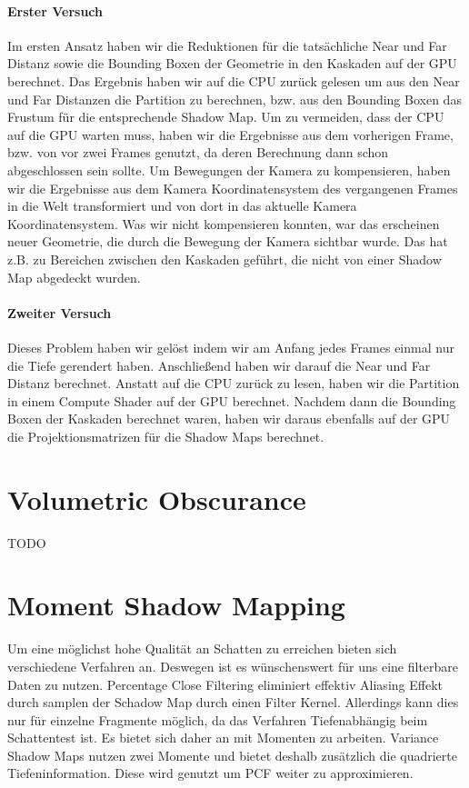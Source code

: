 \documentclass[runningheaders,a4paper]{llncs}
\begin{document}
\paragraph{Erster Versuch}
Im ersten Ansatz haben wir die Reduktionen für die tatsächliche Near und Far Distanz sowie die Bounding Boxen der Geometrie in den Kaskaden auf der GPU berechnet.
Das Ergebnis haben wir auf die CPU zurück gelesen um aus den Near und Far Distanzen die Partition zu berechnen, bzw. aus den Bounding Boxen das Frustum für die entsprechende Shadow Map.
Um zu vermeiden, dass der CPU auf die GPU warten muss, haben wir die Ergebnisse aus dem vorherigen Frame, bzw. von vor zwei Frames genutzt, da deren Berechnung dann schon abgeschlossen sein sollte.
Um Bewegungen der Kamera zu kompensieren, haben wir die Ergebnisse aus dem Kamera Koordinatensystem des vergangenen Frames in die Welt transformiert und von dort in das aktuelle Kamera Koordinatensystem.
Was wir nicht kompensieren konnten, war das erscheinen neuer Geometrie, die durch die Bewegung der Kamera sichtbar wurde.
Das hat z.B. zu Bereichen zwischen den Kaskaden geführt, die nicht von einer Shadow Map abgedeckt wurden.

\paragraph{Zweiter Versuch}
Dieses Problem haben wir gelöst indem wir am Anfang jedes Frames einmal nur die Tiefe gerendert haben.
Anschließend haben wir darauf die Near und Far Distanz berechnet.
Anstatt auf die CPU zurück zu lesen, haben wir die Partition in einem Compute Shader auf der GPU berechnet.
Nachdem dann die Bounding Boxen der Kaskaden berechnet waren, haben wir daraus ebenfalls auf der GPU die Projektionsmatrizen für die Shadow Maps berechnet.

\section{Volumetric Obscurance}

	TODO
	
\section{Moment Shadow Mapping}
Um eine möglichst hohe Qualität an Schatten zu erreichen bieten sich verschiedene Verfahren an. Deswegen ist es wünschenswert für uns eine filterbare Daten zu nutzen. Percentage Close Filtering eliminiert effektiv Aliasing Effekt durch samplen der Schadow Map durch einen Filter Kernel.\cite{msm} Allerdings kann dies nur für einzelne Fragmente möglich, da das Verfahren Tiefenabhängig beim Schattentest ist.\citep{msm}
Es bietet sich daher an mit Momenten zu arbeiten. Variance Shadow Maps nutzen zwei Momente und bietet deshalb zusätzlich die quadrierte Tiefeninformation. Diese wird genutzt um PCF weiter zu approximieren.
\end{document}
